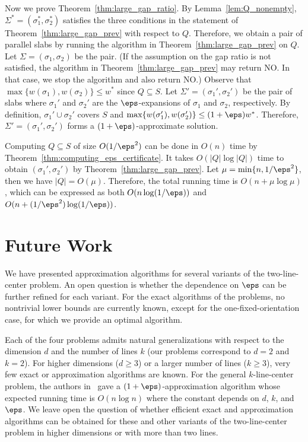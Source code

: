Now we prove Theorem~\ref{thm:large_gap_ratio}.
By Lemma~\ref{lem:Q_nonempty}, $\Sigma^*=(\sigma_1^*, \sigma_2^*)$ satisfies the three conditions in the statement of Theorem~\ref{thm:large_gap_prev} with respect to $Q$. 
Therefore, we obtain a pair of parallel slabs by running the algorithm in Theorem~\ref{thm:large_gap_prev} on $Q$. 
Let $\Sigma=(\sigma_1, \sigma_2)$ be the pair. (If the assumption on the gap ratio is not satisfied, the algorithm in Theorem~\ref{thm:large_gap_prev} may return NO. In that case, we stop the algorithm and also return NO.) 
Observe that $\max\{w(\sigma_1), w(\sigma_2) \} \le w^*$ since $Q\subseteq S$. 
Let $\Sigma'= (\sigma_1', \sigma_2')$ be the pair of slabs where $\sigma_1'$ and  $\sigma_2'$ are the $\eps$-expansions of $\sigma_1$ and $\sigma_2$, respectively.
By definition, $\sigma_1'\cup \sigma_2'$ covers $S$ and $\max \{w(\sigma_1'), w(\sigma_2') \} \le (1+\eps)w^*$. 
Therefore, $\Sigma'= (\sigma_1', \sigma_2')$ forms a $(1+\eps)$-approximate solution. 

Computing $Q\subseteq S$ of size $O(1/\eps^2)$ can be done in $O(n)$ time by Theorem~\ref{thm:computing_eps_certificate}.
It takes $O(|Q|\log |Q|)$ time to obtain $(\sigma_1', \sigma_2')$ by Theorem~\ref{thm:large_gap_prev}. 
Let $\mu = \min \{n, 1/\eps^2\}$, then we have $|Q| = O(\mu)$. 
Therefore, the total running time is $O(n + \mu \log \mu)$, which can be expressed as both $O(n \log (1/\eps))$ and $O(n + (1/\eps^2) \log (1/\eps))$. 






\section{Future Work}

We have presented approximation algorithms for several variants of the two-line-center problem. An open question is whether the dependence on $\eps$ can be further refined for each variant. For the exact algorithms of the problems, no nontrivial lower bounds are currently known, except for the one-fixed-orientation case, for which we provide an optimal algorithm.

Each of the four problems admits natural generalizations with respect to the dimension $d$ and the number of lines $k$ (our problems correspond to $d=2$ and $k=2$). For higher dimensions ($d \ge 3$) or a larger number of lines ($k \ge 3$), very few exact or approximation algorithms are known. 
For the general $k$-line-center problem, the authors in~\cite{agarwal2005approximation} gave a $(1+\eps)$-approximation algorithm whose expected running time is $O(n\log n)$ where the constant depends on $d$, $k$, and $\eps$. 
We leave open the question of whether efficient exact and approximation algorithms can be obtained for these and other variants of the two-line-center problem in higher dimensions or with more than two lines.

